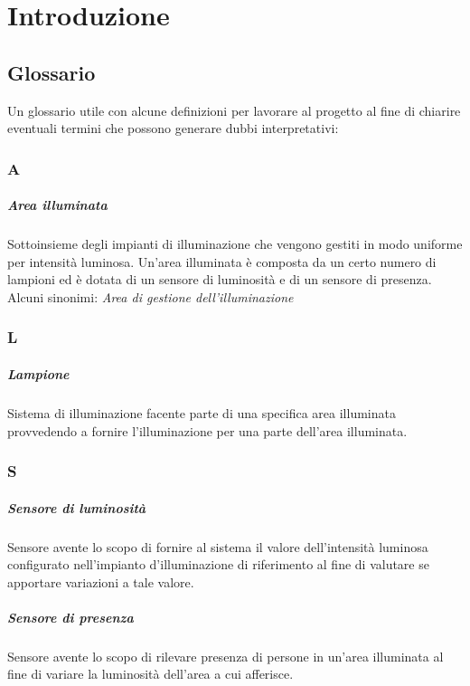 \chapter{Introduzione}

\section{Glossario}
Un glossario utile con alcune definizioni per lavorare al progetto al fine di chiarire eventuali termini che possono generare dubbi interpretativi:

\subsection*{A}

\paragraph{Area illuminata} Sottoinsieme degli impianti di illuminazione che vengono gestiti in modo uniforme per intensità luminosa. Un'area illuminata è composta da un certo numero di lampioni ed è dotata di un sensore di luminosità e di un sensore di presenza. Alcuni sinonimi: \textit{Area di gestione dell'illuminazione}

\subsection*{L}
\paragraph{Lampione} Sistema di illuminazione facente parte di una specifica area illuminata provvedendo a fornire l'illuminazione per una parte dell'area illuminata.

\subsection*{S}
\paragraph{Sensore di luminosità} Sensore avente lo scopo di fornire al sistema il valore dell'intensità luminosa configurato nell'impianto d'illuminazione di riferimento al fine di valutare se apportare variazioni a tale valore.

\paragraph{Sensore di presenza} Sensore avente lo scopo di rilevare presenza di persone in un'area illuminata al fine di variare la luminosità dell'area a cui afferisce.

